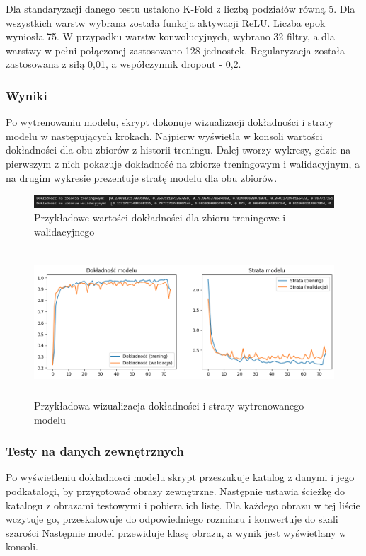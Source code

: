 Dla standaryzacji danego testu ustalono K-Fold z liczbą podziałów równą 5.
Dla wszystkich warstw wybrana została funkcja aktywacji ReLU.
Liczba epok wyniosła 75.
W przypadku warstw konwolucyjnych, wybrano 32 filtry, a dla warstwy w pełni połączonej zastosowano 128 jednostek.
Regularyzacja została zastosowana z siłą 0,01, a współczynnik dropout - 0,2.

\subsubsection{Wyniki}
Po wytrenowaniu modelu, skrypt dokonuje wizualizacji dokładności i straty modelu w następujących krokach.
Najpierw wyświetla w konsoli wartości dokładności dla obu zbiorów z historii treningu.
Dalej tworzy wykresy, gdzie na pierwszym z nich pokazuje dokładność na zbiorze treningowym i walidacyjnym,
a na drugim wykresie prezentuje stratę modelu dla obu zbiorów.

\begin{figure}[ht]
	\centering
	\includegraphics[width=15cm]{partials/images/test-standard-result.png}
	\caption{Przykładowe wartości dokładności dla zbioru treningowe i walidacyjnego}
	\label{Fig:tests-wyniki-2}
\end{figure}
\FloatBarrier

\begin{figure}[ht]
	\centering
	\includegraphics[height=5.5cm]{partials/images/tests/v2_epoch75.png}
	\caption{Przykładowa wizualizacja dokładności i straty wytrenowanego modelu}
	\label{Fig:tests-wyniki-1}
\end{figure}
\FloatBarrier

\subsubsection{Testy na danych zewnętrznych}
Po wyświetleniu dokładnosci modelu skrypt przeszukuje katalog z danymi i jego podkatalogi, by przygotować obrazy zewnętrzne.
Następnie ustawia ścieżkę do katalogu z obrazami testowymi i pobiera ich listę.
Dla każdego obrazu w tej liście wczytuje go, przeskalowuje do odpowiedniego rozmiaru i konwertuje do skali szarości
Następnie model przewiduje klasę obrazu, a wynik jest wyświetlany w konsoli.


